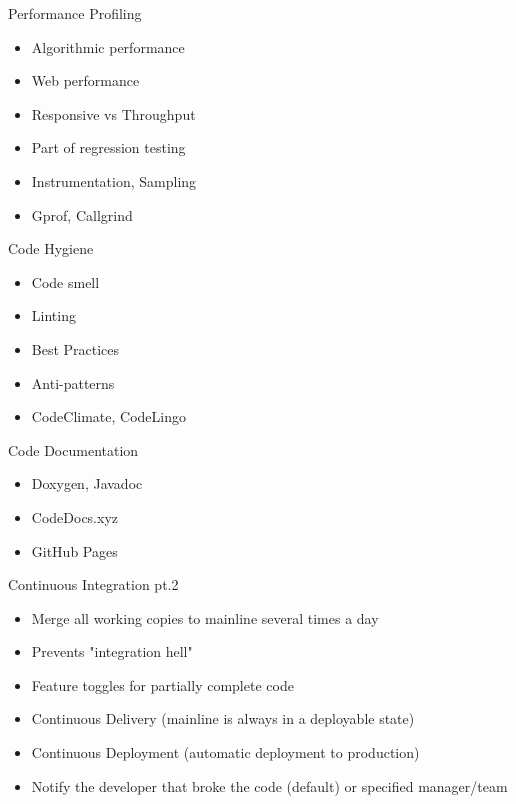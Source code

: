 \documentclass{beamer}
\begin{document}
\begin{frame}{Performance Profiling}
	\begin{itemize}
		\item Algorithmic performance
		\item Web performance
		\item Responsive vs Throughput
		\item Part of regression testing
		\item Instrumentation, Sampling
		\item Gprof, Callgrind
	\end{itemize}
\end{frame}

\begin{frame}{Code Hygiene}
	\begin{itemize}
		\item Code smell
		\item Linting
		\item Best Practices
		\item Anti-patterns
		\item CodeClimate, CodeLingo
	\end{itemize}
\end{frame}

\begin{frame}{Code Documentation}
	\begin{itemize}
		\item Doxygen, Javadoc
		\item CodeDocs.xyz
		\item GitHub Pages
	\end{itemize}
\end{frame}

\begin{frame}{Continuous Integration pt.2}
	\begin{itemize}
		\item Merge all working copies to mainline several times a day
		\item Prevents "integration hell"
		\item Feature toggles for partially complete code
		\item Continuous Delivery (mainline is always in a deployable state)
		\item Continuous Deployment (automatic deployment to production)
		\item Notify the developer that broke the code (default) or specified manager/team
	\end{itemize}
\end{frame}
\end{document}
